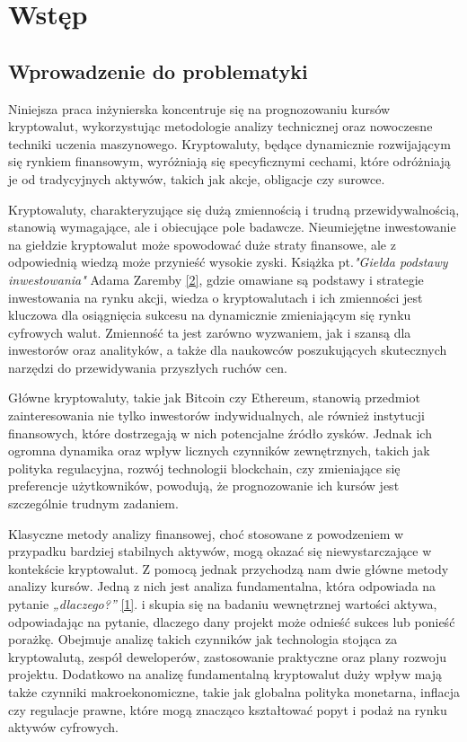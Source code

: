 \documentclass[12pt,a4paper,twoside, inzynierska]{pwr_wmat_praca_dyplomowa}
\theoremstyle{plain}
\numberwithin{theorem}{chapter}
\theoremstyle{definition}
\numberwithin{theorem}{chapter}
\begin{document}
	\frontmatter
	\maketitle
	\mainmatter
\tableofcontents	
	
	\chapter{Wstęp}
	\section{Wprowadzenie do problematyki}
	
	Niniejsza praca inżynierska koncentruje się na prognozowaniu kursów kryptowalut, wykorzystując metodologie analizy technicznej oraz nowoczesne techniki uczenia maszynowego. Kryptowaluty, będące dynamicznie rozwijającym się rynkiem finansowym, wyróżniają się specyficznymi cechami, które odróżniają je od tradycyjnych aktywów, takich jak akcje, obligacje czy surowce.
	
	Kryptowaluty, charakteryzujące się dużą zmiennością i trudną przewidywalnością, stanowią wymagające, ale i obiecujące pole badawcze. Nieumiejętne inwestowanie na giełdzie kryptowalut może spowodować duże straty finansowe, ale z odpowiednią wiedzą może przynieść wysokie zyski. Książka pt.\emph{"Giełda podstawy inwestowania"} Adama Zaremby \hyperref[info2]{[2]}, gdzie omawiane są podstawy i strategie inwestowania na rynku akcji, wiedza o kryptowalutach i ich zmienności jest kluczowa dla osiągnięcia sukcesu na dynamicznie zmieniającym się rynku cyfrowych walut. Zmienność ta jest zarówno wyzwaniem, jak i szansą dla inwestorów oraz analityków, a także dla naukowców poszukujących skutecznych narzędzi do przewidywania przyszłych ruchów cen.
	
	Główne kryptowaluty, takie jak Bitcoin czy Ethereum, stanowią przedmiot zainteresowania nie tylko inwestorów indywidualnych, ale również instytucji finansowych, które dostrzegają w nich potencjalne źródło zysków. Jednak ich ogromna dynamika oraz wpływ licznych czynników zewnętrznych, takich jak polityka regulacyjna, rozwój technologii blockchain, czy zmieniające się preferencje użytkowników, powodują, że prognozowanie ich kursów jest szczególnie trudnym zadaniem.
	
	Klasyczne metody analizy finansowej, choć stosowane z powodzeniem w przypadku bardziej stabilnych aktywów, mogą okazać się niewystarczające w kontekście kryptowalut. Z pomocą jednak przychodzą nam dwie główne metody analizy kursów. Jedną z nich jest analiza fundamentalna, która odpowiada na pytanie \emph{„dlaczego?”} \hyperref[info1]{[1]}. i skupia się na badaniu wewnętrznej wartości aktywa, odpowiadając na pytanie, dlaczego dany projekt może odnieść sukces lub ponieść porażkę. Obejmuje analizę takich czynników jak technologia stojąca za kryptowalutą, zespół deweloperów, zastosowanie praktyczne oraz plany rozwoju projektu. Dodatkowo na analizę fundamentalną kryptowalut duży wpływ mają także czynniki makroekonomiczne, takie jak globalna polityka monetarna, inflacja czy regulacje prawne, które mogą znacząco kształtować popyt i podaż na rynku aktywów cyfrowych.
	
\end{document}
